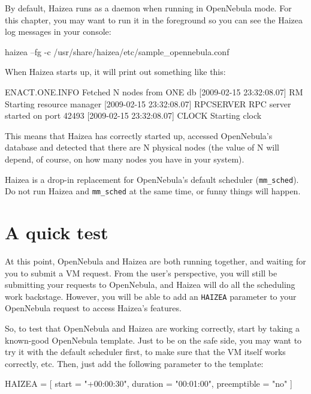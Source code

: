 By default, Haizea runs as a daemon when running in OpenNebula mode. For this chapter, you may want to run it in the foreground so you can see the Haizea log messages in your console:

\begin{wideshellverbatim}
haizea --fg -c /usr/share/haizea/etc/sample_opennebula.conf
\end{wideshellverbatim}

When Haizea starts up, it will print out something like this:

\begin{wideshellverbatim}
[2009-02-15 23:32:08.07] ENACT.ONE.INFO Fetched N nodes from ONE db
[2009-02-15 23:32:08.07] RM      Starting resource manager
[2009-02-15 23:32:08.07] RPCSERVER RPC server started on port 42493
[2009-02-15 23:32:08.07] CLOCK   Starting clock
\end{wideshellverbatim}

This means that Haizea has correctly started up, accessed OpenNebula's database and detected that there are N physical nodes (the value of N will depend, of course, on how many nodes you have in your system).

\begin{warning}
Haizea is a drop-in replacement for OpenNebula's default scheduler (\texttt{mm\_sched}). Do not run Haizea and \texttt{mm\_sched} at the same time, or funny things will happen.
\end{warning}

\section{A quick test}

At this point, OpenNebula and Haizea are both running together, and waiting for you to submit a VM request. From the user's perspective, you will still be submitting your requests to OpenNebula, and Haizea will do all the scheduling work backstage. However, you will be able to add an \texttt{HAIZEA} parameter to your OpenNebula request to access Haizea's features.

So, to test that OpenNebula and Haizea are working correctly, start by taking a known-good OpenNebula template. Just to be on the safe side, you may want to try it with the default scheduler first, to make sure that the VM itself works correctly, etc. Then, just add the following parameter to the template:

\begin{wideshellverbatim}
HAIZEA = [
  start        = "+00:00:30",
  duration     = "00:01:00",
  preemptible  = "no"
]
\end{wideshellverbatim}

